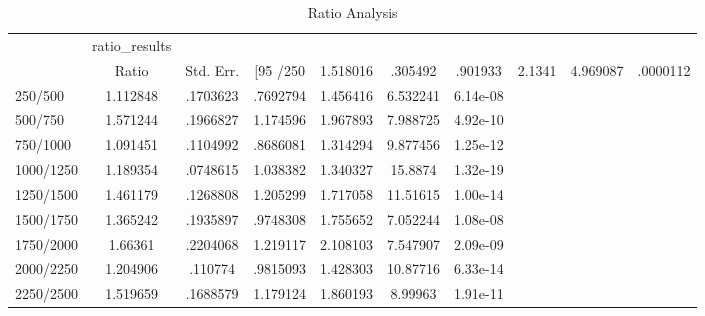 \begin{table}[h]\centering
\caption{Ratio Analysis}
\begin{tabular}{l*{6}{c}}
\hline\hline
            &ratio\_results&            &            &            &            &            \\
            &       Ratio&   Std. Err.&  [95%
/250     &    1.518016&     .305492&     .901933&      2.1341&    4.969087&    .0000112\\
250/500     &    1.112848&    .1703623&    .7692794&    1.456416&    6.532241&    6.14e-08\\
500/750     &    1.571244&    .1966827&    1.174596&    1.967893&    7.988725&    4.92e-10\\
750/1000    &    1.091451&    .1104992&    .8686081&    1.314294&    9.877456&    1.25e-12\\
1000/1250   &    1.189354&    .0748615&    1.038382&    1.340327&     15.8874&    1.32e-19\\
1250/1500   &    1.461179&    .1268808&    1.205299&    1.717058&    11.51615&    1.00e-14\\
1500/1750   &    1.365242&    .1935897&    .9748308&    1.755652&    7.052244&    1.08e-08\\
1750/2000   &     1.66361&    .2204068&    1.219117&    2.108103&    7.547907&    2.09e-09\\
2000/2250   &    1.204906&     .110774&    .9815093&    1.428303&    10.87716&    6.33e-14\\
2250/2500   &    1.519659&    .1688579&    1.179124&    1.860193&     8.99963&    1.91e-11\\
\hline\hline
\end{tabular}
\end{table}
